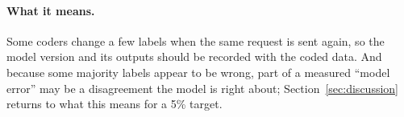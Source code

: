 \paragraph{What it means.} Some coders change a few labels when the same request is sent again, so the model version and its
outputs should be recorded with the coded data. And because some majority labels appear to be wrong, part of a measured
``model error'' may be a disagreement the model is right about; Section~\ref{sec:discussion} returns to what this means for a
5\% target.


